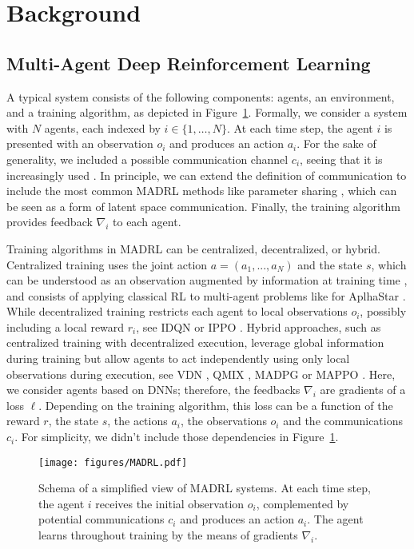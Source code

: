 \section{Background}

\subsection{Multi-Agent Deep Reinforcement Learning}
 A typical system consists of the following components: agents, an environment, and a training algorithm, as depicted in Figure~\ref{fig:madrl_system}. Formally, we consider a system with $N$ agents, each indexed by $i \in \{1, \dots, N\}$. At each time step, the agent $i$ is presented with an observation $o_i$ and produces an action $a_i$. For the sake of generality, we included a possible communication channel $c_i$, seeing that it is increasingly used \cite{Zhu2022ASO}. In principle, we can extend the definition of communication to include the most common MADRL methods like parameter sharing \cite{Gupta2017CooperativeMC,Chu2017ParameterSD}, which can be seen as a form of latent space communication. Finally, the training algorithm provides feedback $\nabla_i$ to each agent.

Training algorithms in MADRL can be centralized, decentralized, or hybrid. Centralized training uses the joint action $a=(a_1,...,a_N)$ and the state $s$, which can be understood as an observation augmented by information at training time \cite{Lambrechts2023InformedPL}, and consists of applying classical RL to multi-agent problems like for AplhaStar \cite{Mathieu2023AlphaStarUL}. While decentralized training restricts each agent to local observations $o_i$, possibly including a local reward $r_i$, see IDQN \cite{Tampuu2015MultiagentCA} or IPPO \cite{Yu2021TheSE}. Hybrid approaches, such as centralized training with decentralized execution, leverage global information during training but allow agents to act independently using only local observations during execution, see VDN \cite{Sunehag2017ValueDecompositionNF}, QMIX \cite{Rashid2018QMIXMV}, MADPG \cite{Lowe2017MultiAgentAF} or MAPPO \cite{Yu2021TheSE}. Here, we consider agents based on DNNs; therefore, the feedbacks $\nabla_i$ are gradients of a loss $\ell$. Depending on the training algorithm, this loss can be a function of the reward $r$, the state $s$, the actions $a_i$, the observations $o_i$ and the communications $c_i$. For simplicity, we didn't include those dependencies in Figure~\ref{fig:madrl_system}.
 
\begin{figure}[ht]
    \centering
    \texttt{[image: figures/MADRL.pdf]}
    \caption{Schema of a simplified view of MADRL systems. At each time step, the agent $i$ receives the initial observation $o_i$, complemented by potential communications $c_i$ and produces an action $a_i$. The agent learns throughout training by the means of gradients $\nabla_i$. }
    \label{fig:madrl_system}
\end{figure}


